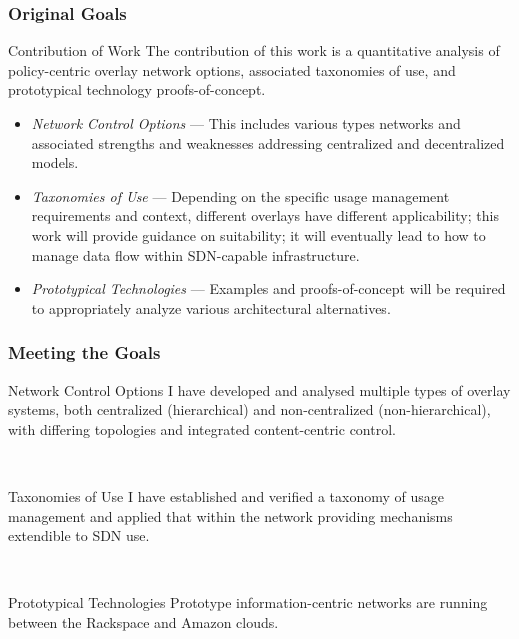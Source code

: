 \documentclass[t,handout]{beamer}
\begin{document}
\begin{frame}
\frametitle{Original Goals}
\begin{beamerboxesrounded}[shadow]{Contribution of Work}
The contribution of this work is a quantitative analysis of policy-centric overlay network options, associated taxonomies of use, and prototypical technology proofs-of-concept.
\end{beamerboxesrounded}
\begin{itemize}
\item \textit{Network Control Options} --- {\small This includes various types networks and associated strengths and weaknesses addressing centralized and decentralized models.}
\item \textit{Taxonomies of Use} --- {\small Depending on the specific usage management requirements and context, different overlays have different applicability; this work will provide guidance on suitability; it will eventually lead to how to manage data flow within SDN-capable infrastructure.}
\item \textit{Prototypical Technologies} --- {\small Examples and proofs-of-concept will be required to appropriately analyze various architectural alternatives.}
\end{itemize}
\end{frame}

\begin{frame}
\frametitle{Meeting the Goals}
\begin{beamerboxesrounded}[shadow]{Network Control Options}
{\small I have developed and analysed multiple types of overlay systems, both centralized (hierarchical) and non-centralized (non-hierarchical), with differing topologies and integrated content-centric control.}
\end{beamerboxesrounded}
~\\
\begin{beamerboxesrounded}[shadow]{Taxonomies of Use}
{\small I have established and verified a taxonomy of usage management and applied that within the network providing mechanisms extendible to SDN use.}
\end{beamerboxesrounded}
~\\
\begin{beamerboxesrounded}[shadow]{Prototypical Technologies}
{\small Prototype information-centric networks are running between the Rackspace and Amazon clouds.}
\end{beamerboxesrounded}
\end{frame}
\end{document}
